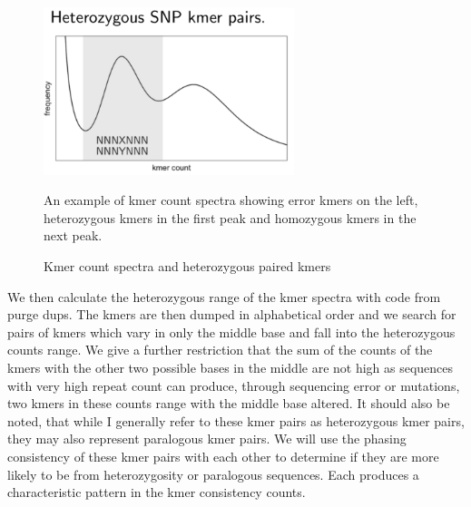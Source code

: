 \begin{figure}[htbp!]

\caption{Kmer count spectra and heterozygous paired kmers}
\label{figure:kmc}
\begin{centering}
\includegraphics[width=0.65\textwidth]{kmc.png}
\par{An example of kmer count spectra showing error kmers on the left, heterozygous kmers in the first peak and homozygous kmers in the next peak.}
\end{centering}
\end{figure}

\par{
We then calculate the heterozygous range of the kmer spectra with code from purge dups\cite{purgedups}. The kmers are then dumped in alphabetical order and we search for pairs of kmers which vary in only the middle base and fall into the heterozygous counts range. We give a further restriction that the sum of the counts of the kmers with the other two possible bases in the middle are not high as sequences with very high repeat count can produce, through sequencing error or mutations, two kmers in these counts range with the middle base altered. It should also be noted, that while I generally refer to these kmer pairs as heterozygous kmer pairs, they may also represent paralogous kmer pairs. We will use the phasing consistency of these kmer pairs with each other to determine if they are more likely to be from heterozygosity or paralogous sequences. Each produces a characteristic pattern in the kmer consistency counts.
}

